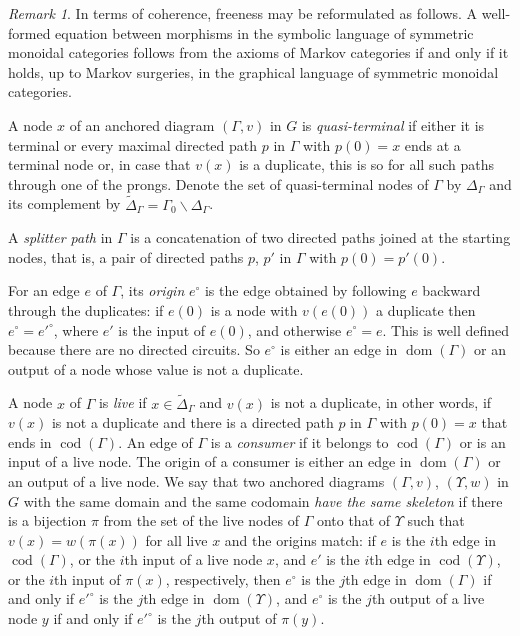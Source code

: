 \documentclass[12pt]{amsart}
\theoremstyle{plain}
\theoremstyle{definition}
\theoremstyle{remark}
\newtheorem{rem}[thm]{Remark}
\numberwithin{equation}{section}
\theoremstyle{plain}
\DeclareMathOperator{\dom}{dom}
\DeclareMathOperator{\cod}{cod}
\newcommand{\0}{\emptyset}
\newcommand{\mi}{\smallsetminus}
\newcommand{\memph}[1]{{\color{magenta}\emph{#1}}}
\begin{document}
\begin{rem}\label{graph:lan:mar}
In terms of coherence, freeness may be reformulated as follows. A well-formed
equation between morphisms in the symbolic language of symmetric monoidal categories
follows from the axioms of Markov categories if and only if it holds, up to Markov surgeries, in the graphical language of symmetric monoidal categories.
\end{rem}


A node $x$ of an anchored diagram $(\Gamma, v)$ in $G$ is \memph{quasi-terminal} if either it is terminal or every maximal directed path $p$ in $\Gamma$ with $p(0) = x$ ends at a terminal node or, in case that $v(x)$ is a duplicate, this is so for all such paths through one of the prongs.  Denote the set of quasi-terminal nodes of $\Gamma$ by $\Delta_\Gamma$ and its complement by  $\tilde \Delta_\Gamma = \Gamma_0 \mi \Delta_\Gamma$.

A \memph{splitter path} in $\Gamma$  is a  concatenation of two directed paths joined at the starting nodes, that is, a pair of directed paths $p$, $p'$ in $\Gamma$ with $p(0) = p'(0)$.

For an edge $e$ of $\Gamma$, its \memph{origin} $e^{\circ}$ is the edge obtained by following $e$ backward through the duplicates: if $e(0)$ is a node with $v(e(0))$ a duplicate then $e^{\circ} = e'^{\circ}$, where $e'$ is the input of $e(0)$, and otherwise $e^{\circ} = e$. This is well defined because there are no directed circuits. So $e^{\circ}$ is either an edge in $\dom(\Gamma)$ or an output of a node whose value is not a duplicate.

A node $x$ of $\Gamma$ is \memph{live} if $x \in \tilde \Delta_\Gamma$ and $v(x)$ is not a duplicate, in other words, if $v(x)$ is not a duplicate and there is a directed path $p$ in $\Gamma$ with $p(0) = x$ that ends in $\cod(\Gamma)$. An edge of $\Gamma$ is a \memph{consumer} if it belongs to $\cod(\Gamma)$ or is an input of a live node. The origin of a consumer is either an edge in $\dom(\Gamma)$ or an output of a live node. We say that two anchored diagrams $(\Gamma, v)$, $(\Upsilon, w)$ in $G$ with the same domain and the same codomain \memph{have the same skeleton} if there is a bijection $\pi$ from the set of the live nodes of $\Gamma$ onto that of $\Upsilon$ such that $v(x) = w(\pi(x))$ for all live $x$ and the origins match: if $e$ is the $i$th edge in $\cod(\Gamma)$, or the $i$th input of a live node $x$, and $e'$ is the $i$th edge in $\cod(\Upsilon)$, or the $i$th input of $\pi(x)$, respectively, then $e^{\circ}$ is the $j$th edge in $\dom(\Gamma)$ if and only if $e'^{\circ}$ is the $j$th edge in $\dom(\Upsilon)$, and $e^{\circ}$ is the $j$th output of a live node $y$ if and only if $e'^{\circ}$ is the $j$th output of $\pi(y)$.
\end{document}
